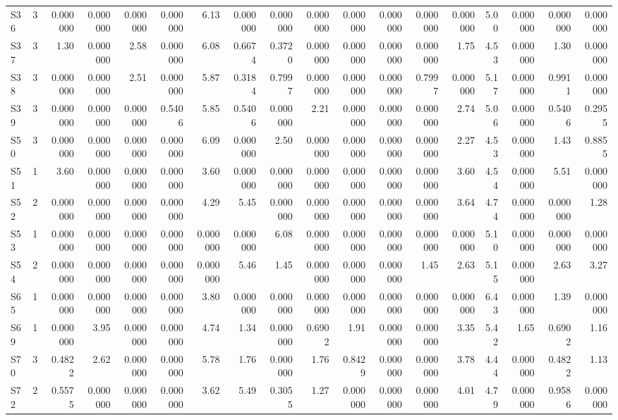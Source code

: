{\begin{longtable}{lrrrrrrrrrrrrrrrrr}
  S36 & 3 & 0.000000 & 0.000000 & 0.000000 & 0.000000 & 6.13 & 0.000000 & 0.000000 & 0.000000 & 0.000000 & 0.000000 & 0.000000 & 0.000000 & 5.00 & 0.000000 & 0.000000 & 0.000000 \\
  S37 & 3 & 1.30 & 0.000000 & 2.58 & 0.000000 & 6.08 & 0.6674 & 0.3720 & 0.000000 & 0.000000 & 0.000000 & 0.000000 & 1.75 & 4.53 & 0.000000 & 1.30 & 0.000000 \\
  S38 & 3 & 0.000000 & 0.000000 & 2.51 & 0.000000 & 5.87 & 0.3184 & 0.7997 & 0.000000 & 0.000000 & 0.000000 & 0.7997 & 0.000000 & 5.17 & 0.000000 & 0.9911 & 0.000000 \\
  S39 & 3 & 0.000000 & 0.000000 & 0.000000 & 0.5406 & 5.85 & 0.5406 & 0.000000 & 2.21 & 0.000000 & 0.000000 & 0.000000 & 2.74 & 5.06 & 0.000000 & 0.5406 & 0.2955 \\
  S50 & 3 & 0.000000 & 0.000000 & 0.000000 & 0.000000 & 6.09 & 0.000000 & 2.50 & 0.000000 & 0.000000 & 0.000000 & 0.000000 & 2.27 & 4.53 & 0.000000 & 1.43 & 0.8855 \\
  S51 & 1 & 3.60 & 0.000000 & 0.000000 & 0.000000 & 3.60 & 0.000000 & 0.000000 & 0.000000 & 0.000000 & 0.000000 & 0.000000 & 3.60 & 4.54 & 0.000000 & 5.51 & 0.000000 \\
  S52 & 2 & 0.000000 & 0.000000 & 0.000000 & 0.000000 & 4.29 & 5.45 & 0.000000 & 0.000000 & 0.000000 & 0.000000 & 0.000000 & 3.64 & 4.74 & 0.000000 & 0.000000 & 1.28 \\
  S53 & 1 & 0.000000 & 0.000000 & 0.000000 & 0.000000 & 0.000000 & 0.000000 & 6.08 & 0.000000 & 0.000000 & 0.000000 & 0.000000 & 0.000000 & 5.10 & 0.000000 & 0.000000 & 0.000000 \\
  S54 & 2 & 0.000000 & 0.000000 & 0.000000 & 0.000000 & 0.000000 & 5.46 & 1.45 & 0.000000 & 0.000000 & 0.000000 & 1.45 & 2.63 & 5.15 & 0.000000 & 2.63 & 3.27 \\
  S65 & 1 & 0.000000 & 0.000000 & 0.000000 & 0.000000 & 3.80 & 0.000000 & 0.000000 & 0.000000 & 0.000000 & 0.000000 & 0.000000 & 0.000000 & 6.43 & 0.000000 & 1.39 & 0.000000 \\
  S69 & 1 & 0.000000 & 3.95 & 0.000000 & 0.000000 & 4.74 & 1.34 & 0.000000 & 0.6902 & 1.91 & 0.000000 & 0.000000 & 3.35 & 5.42 & 1.65 & 0.6902 & 1.16 \\
  S70 & 3 & 0.4822 & 2.62 & 0.000000 & 0.000000 & 5.78 & 1.76 & 0.000000 & 1.76 & 0.8429 & 0.000000 & 0.000000 & 3.78 & 4.44 & 0.000000 & 0.4822 & 1.13 \\
  S72 & 2 & 0.5575 & 0.000000 & 0.000000 & 0.000000 & 3.62 & 5.49 & 0.3055 & 1.27 & 0.000000 & 0.000000 & 0.000000 & 4.01 & 4.79 & 0.000000 & 0.9586 & 0.000000 \\

\end{longtable}}
